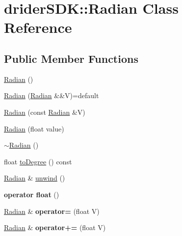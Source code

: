\hypertarget{classdrider_s_d_k_1_1_radian}{}\section{drider\+S\+DK\+:\+:Radian Class Reference}
\label{classdrider_s_d_k_1_1_radian}
\subsection*{Public Member Functions}
\begin{DoxyCompactItemize}
\item 
\hyperlink{classdrider_s_d_k_1_1_radian_a3e670b9e0a28e363b8b20645e2962c66}{Radian} ()
\item 
\hyperlink{classdrider_s_d_k_1_1_radian_a3f93a33ebb6195d6732bff6262a4c91c}{Radian} (\hyperlink{classdrider_s_d_k_1_1_radian}{Radian} \&\&V)=default
\item 
\hyperlink{classdrider_s_d_k_1_1_radian_a8487633584761b8cabbe182cf26f5168}{Radian} (const \hyperlink{classdrider_s_d_k_1_1_radian}{Radian} \&V)
\item 
\hyperlink{classdrider_s_d_k_1_1_radian_a21d244cf4c918a5658b69dd1b4df2d6e}{Radian} (float value)
\item 
\hyperlink{classdrider_s_d_k_1_1_radian_a9b1711276eed04187623b4cb047c90ce}{$\sim$\+Radian} ()
\item 
float \hyperlink{classdrider_s_d_k_1_1_radian_a2b848dd9f60fbdb8e113620e9933f3d8}{to\+Degree} () const
\item 
\hyperlink{classdrider_s_d_k_1_1_radian}{Radian} \& \hyperlink{classdrider_s_d_k_1_1_radian_ac9d138249e554f129d2ffc0ddb39b881}{unwind} ()
\item 
\mbox{\label{classdrider_s_d_k_1_1_radian_abcf6e621b7842bf900ef194a0506dcaf}} 
{\bfseries operator float} ()
\item 
\mbox{\label{classdrider_s_d_k_1_1_radian_aca76d9162983d1a6cc372abdc0ae4c33}} 
\hyperlink{classdrider_s_d_k_1_1_radian}{Radian} \& {\bfseries operator=} (float V)
\item 
\mbox{\label{classdrider_s_d_k_1_1_radian_a13e910cd2706b9c5faf6498329267a2c}} 
\hyperlink{classdrider_s_d_k_1_1_radian}{Radian} \& {\bfseries operator+=} (float V)
\item 

\end{DoxyCompactItemize}

